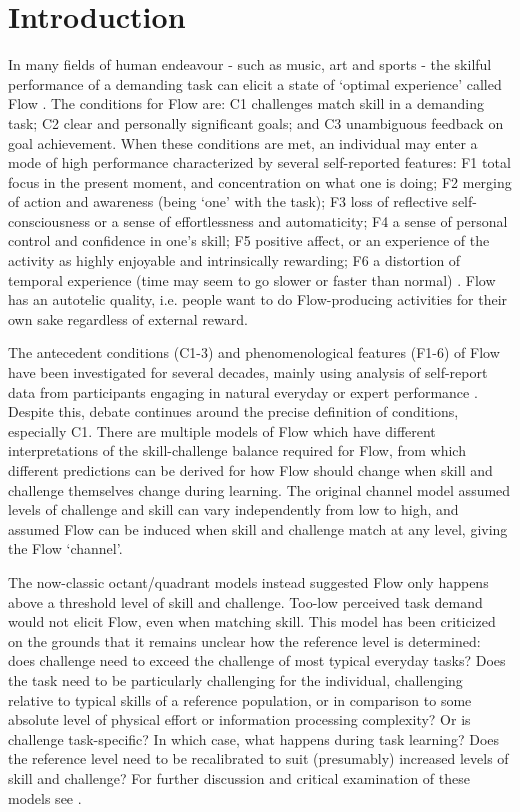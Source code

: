 \documentclass{frontierstyle/frontiersSCNS}
\begin{document}
\section{Introduction}

In many fields of human endeavour - such as music, art and sports - the skilful performance of a demanding task can elicit a state of `optimal experience' called Flow \citep{Csikszentmihalyi1975}. The conditions for Flow are: {\sf C1} challenges match skill in a demanding task; {\sf C2} clear and personally significant goals; and {\sf C3} unambiguous feedback on goal achievement. When these conditions are met, an individual may enter a mode of high performance characterized by several self-reported features: {\sf F1} total focus in the present moment, and concentration on what one is doing; {\sf F2} merging of action and awareness (being `one' with the task); {\sf F3} loss of reflective self-consciousness or a sense of effortlessness and automaticity; {\sf F4} a sense of personal control and confidence in one's skill; {\sf F5} positive affect, or an experience of the activity as highly enjoyable and intrinsically rewarding; {\sf F6} a distortion of temporal experience (time may seem to go slower or faster than normal) \citep{Nakamura2002,Engeser2012intro,Keller2012}. Flow has an autotelic quality, i.e. people want to do Flow-producing activities for their own sake regardless of external reward.

The antecedent conditions ({\sf C1-3}) and phenomenological features ({\sf F1-6}) of Flow have been investigated for several decades, mainly using analysis of self-report data from participants engaging in natural everyday or expert performance \citep{Csikszentmihalyi1971,Moneta2012}. Despite this, debate continues around the precise definition of conditions, especially {\sf C1}. There are multiple models of Flow which have different interpretations of the skill-challenge balance required for Flow, from which different predictions can be derived for how Flow should change when skill and challenge themselves change during learning. The original channel model \citep{Csikszentmihalyi1975} assumed levels of challenge and skill can vary independently from low to high, and assumed Flow can be induced when skill and challenge match at any level, giving the Flow `channel'.

The now-classic octant/quadrant models \citep{Massimini1988} instead suggested Flow only happens above a threshold level of skill and challenge. Too-low perceived task demand would not elicit Flow, even when matching skill. This model has been criticized on the grounds that it remains unclear how the reference level is determined: does challenge need to exceed the challenge of most typical everyday tasks? Does the task need to be particularly challenging for the individual, challenging relative to typical skills of a reference population, or in comparison to some absolute level of physical effort or information processing complexity? Or is challenge task-specific? In which case, what happens during task learning? Does the reference level need to be recalibrated to suit (presumably) increased levels of skill and challenge? For further discussion and critical examination of these models see \cite{Moneta2012,Keller2012}.
\end{document}
